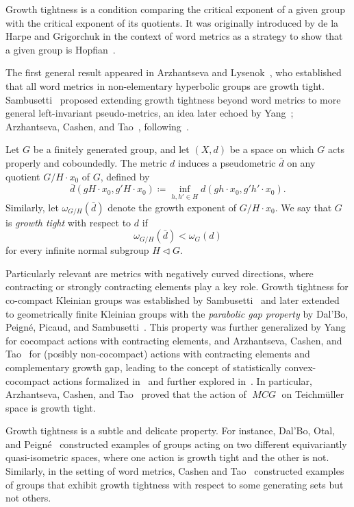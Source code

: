\documentclass{amsart}
\numberwithin{thm}{section}
\numberwithin{figure}{section}
\theoremstyle{definition}
\theoremstyle{definition}
\theoremstyle{remark}
\numberwithin{equation}{section}
\DeclareMathOperator{\MCG}{\mathit{MCG}}
\theoremstyle{plain}
\begin{document}
Growth tightness is a condition comparing the critical exponent of a given group with the critical exponent of its quotients. It was originally introduced by de la Harpe and Grigorchuk in the context of word metrics as a strategy to show that a given group is Hopfian~\cite{growth_tight}. 

The first general result appeared in Arzhantseva and Lysenok~\cite{AL02:GrowthTight}, who established that all word metrics in non-elementary hyperbolic groups are growth tight. Sambusetti~\cite{Sam02:GrowthTight_Surface} proposed extending growth tightness beyond word metrics to more general left-invariant pseudo-metrics, an idea later echoed by Yang~\cite{Yan14:GrowthTight}; Arzhantseva, Cashen, and Tao~\cite{Arzhantseva2015}, following~\cite{DPPS11:GrowthTight}. 

Let $G$ be a finitely generated group, and let $(X,d)$ be a space on which $G$ acts properly and coboundedly. The metric $d$ induces a pseudometric $\bar{d}$ on any quotient $G/H \cdot x_0$ of $G$, defined by  
\[
\bar{d}(g H \cdot x_0, g' H \cdot x_0) \coloneqq \inf_{h, h' \in H} d(g h\cdot x_0, g' h' \cdot x_0).
\]
Similarly, let $\omega_{G/H}(\bar{d})$ denote the growth exponent of $G/H \cdot x_0$. We say that $G$ is \emph{growth tight} with respect to $d$ if 
\[
\omega_{G/H}(\bar{d}) < \omega_{G}(d) 
\] 
for every infinite normal subgroup $H \triangleleft G$. 

Particularly relevant are metrics with negatively curved directions, where contracting or strongly contracting elements play a key role. Growth tightness for co-compact Kleinian groups was established by Sambusetti~\cite{Sam08:GrowthTight_Cocompact} and later extended to geometrically finite Kleinian groups with the \emph{parabolic gap property} by Dal'Bo, Peigné, Picaud, and Sambusetti~\cite{DPPS11:GrowthTight}. This property was further generalized by Yang~\cite{Yan14:GrowthTight} for cocompact actions with contracting elements, and Arzhantseva, Cashen, and Tao~\cite{Arzhantseva2015} for (posibly non-cocompact) actions with contracting elements and complementary growth gap, leading to the concept of statistically convex-cocompact actions formalized in~\cite{Yang17:ConvexCocompact} and further explored in~\cite{DY24:GrowthTight}. In particular, Arzhantseva, Cashen, and Tao~\cite{Arzhantseva2015} proved that the action of $\MCG$ on Teichmüller space is growth tight.

Growth tightness is a subtle and delicate property. For instance, Dal'Bo, Otal, and Peigné~\cite{DOP00:GrowthTight_Counter} constructed examples of groups acting on two different equivariantly quasi-isometric spaces, where one action is growth tight and the other is not. Similarly, in the setting of word metrics, Cashen and Tao~\cite{CT16:GrowthTight_Word} constructed examples of groups that exhibit growth tightness with respect to some generating sets but not others.
\end{document}
